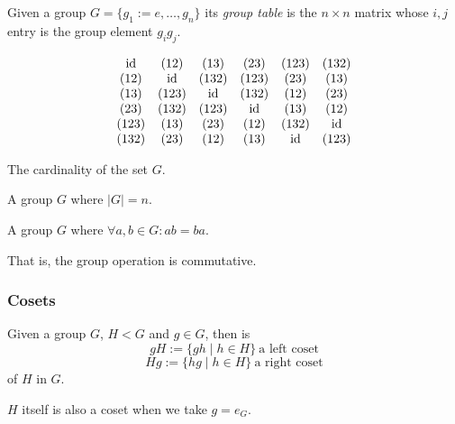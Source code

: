 \begin{definition}
   Given a group \(G = \{g_1 := e, \ldots, g_n\}\) its \emph{group table} is the \(n \times n\) matrix whose \(i,j\) entry is the group element \(g_ig_j\).
\end{definition}
\begin{example}
   \[\begin{matrix}
         \operatorname{id}  & (12)  & (13)  & (23)  & (123) & (132) \\
         (12) & \operatorname{id}   & (132) & (123) & (23)  & (13)  \\
         (13) & (123) & \operatorname{id}   & (132) & (12)  & (23)  \\
         (23) & (132) & (123) & \operatorname{id}   & (13)  & (12)  \\
         (123) & (13) & (23) & (12)   & (132) & \operatorname{id}   \\
         (132) & (23) & (12) & (13)   & \operatorname{id}   & (123) \\
   \end{matrix}\]
\end{example}

\begin{definition}
   The cardinality of the set \(G\).
\end{definition}

\begin{definition}
   A group \(G\) where \(|G| = n\).
\end{definition}

\begin{definition}\label{def:abel_group}
   A group \(G\) where \(\forall a, b \in G: ab = ba\).
\end{definition}
\begin{remark}
   That is, the group operation is commutative.
\end{remark}

\subsubsection{Cosets}
\begin{definition}
   Given a group \(G\), \(H < G\) and \(g \in G\), then is
   \[gH := \{gh \mid h \in H\}~\text{a left coset}\]
   \[Hg := \{hg \mid h \in H\}~\text{a right coset}\]
   of \(H\) in \(G\).
\end{definition}
\begin{remark}
   \(H\) itself is also a coset when we take \(g = e_G\).
\end{remark}

